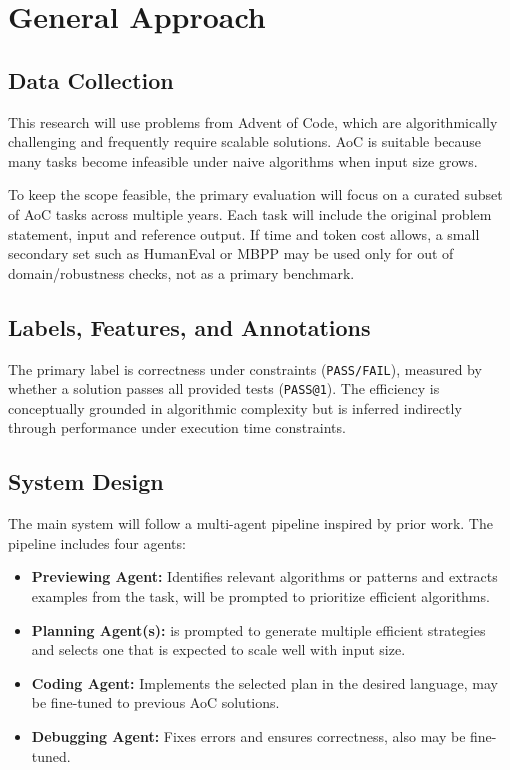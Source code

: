 \documentclass{article}
\begin{document}
\section{General Approach}

\subsection*{Data Collection}

This research will use problems from Advent of Code, which are algorithmically challenging and frequently require scalable solutions. AoC is suitable because many tasks become infeasible under naive algorithms when input size grows.

To keep the scope feasible, the primary evaluation will focus on a curated subset of AoC tasks across multiple years. Each task will include the original problem statement, input and reference output. If time and token cost allows, a small secondary set such as HumanEval or MBPP may be used only for out of domain/robustness checks, not as a primary benchmark.

\subsection*{Labels, Features, and Annotations}

The primary label is correctness under constraints (\texttt{PASS/FAIL}), measured by whether a solution passes all provided tests (\texttt{PASS@1}). The efficiency is conceptually grounded in algorithmic complexity but is inferred indirectly through performance under execution time constraints.


\subsection*{System Design}

The main system will follow a multi-agent pipeline inspired by prior work. The pipeline includes four agents:

\begin{itemize}[noitemsep]
    \item \textbf{Previewing Agent:} Identifies relevant algorithms or patterns and extracts examples from the task, will be prompted to prioritize efficient algorithms.
    \item \textbf{Planning Agent(s):} is prompted to generate multiple efficient strategies and selects one that is expected to scale well with input size.
    \item \textbf{Coding Agent:} Implements the selected plan in the desired language, may be fine-tuned to previous AoC solutions.
    \item \textbf{Debugging Agent:} Fixes errors and ensures correctness, also may be fine-tuned.
\end{itemize}
\end{document}
